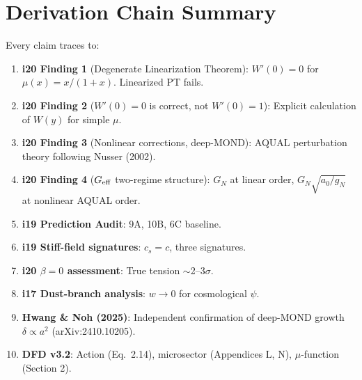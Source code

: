 \documentclass[11pt]{article}
\newcommand{\Geff}{G_{\rm eff}}
\newcommand{\aM}{a_0}
\begin{document}
\section*{Derivation Chain Summary}

Every claim traces to:
\begin{enumerate}
\item \textbf{i20 Finding 1} (Degenerate Linearization Theorem): $W'(0) = 0$
  for $\mu(x) = x/(1+x)$. Linearized PT fails.
\item \textbf{i20 Finding 2} ($W'(0) = 0$ is correct, not $W'(0) = 1$):
  Explicit calculation of $W(y)$ for simple $\mu$.
\item \textbf{i20 Finding 3} (Nonlinear corrections, deep-MOND):
  AQUAL perturbation theory following Nusser (2002).
\item \textbf{i20 Finding 4} ($\Geff$ two-regime structure):
  $G_N$ at linear order, $G_N\sqrt{\aM/g_N}$ at nonlinear AQUAL order.
\item \textbf{i19 Prediction Audit}: 9A, 10B, 6C baseline.
\item \textbf{i19 Stiff-field signatures}: $c_s = c$, three signatures.
\item \textbf{i20 $\beta = 0$ assessment}: True tension $\sim$2--3$\sigma$.
\item \textbf{i17 Dust-branch analysis}: $w \to 0$ for cosmological $\psi$.
\item \textbf{Hwang \& Noh (2025)}: Independent confirmation of deep-MOND
  growth $\delta \propto a^2$ (arXiv:2410.10205).
\item \textbf{DFD v3.2}: Action (Eq.~2.14), microsector (Appendices L, N),
  $\mu$-function (Section 2).
\end{enumerate}
\end{document}
